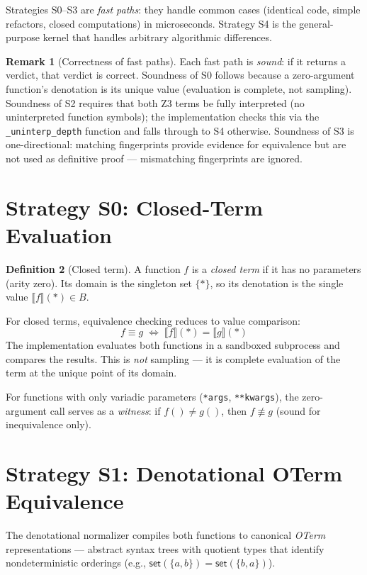 \documentclass[11pt,a4paper]{report}
\theoremstyle{definition}
\newtheorem{definition}{Definition}[chapter]
\newtheorem{remark}[definition]{Remark}
\theoremstyle{plain}
\newcommand{\den}[1]{\llbracket #1 \rrbracket}
\begin{document}
Strategies S0--S3 are \emph{fast paths}: they handle common cases
(identical code, simple refactors, closed computations) in
microseconds.  Strategy S4 is the general-purpose kernel that
handles arbitrary algorithmic differences.

\begin{remark}[Correctness of fast paths]
Each fast path is \emph{sound}: if it returns a verdict, that
verdict is correct.  Soundness of S0 follows because a zero-argument
function's denotation is its unique value (evaluation is
complete, not sampling).  Soundness of S2 requires that both
Z3 terms be fully interpreted (no uninterpreted function symbols);
the implementation checks this via the \texttt{\_uninterp\_depth}
function and falls through to S4 otherwise.  Soundness of S3 is
one-directional: matching fingerprints provide evidence for
equivalence but are not used as definitive proof --- mismatching
fingerprints are ignored.
\end{remark}

\section{Strategy S0: Closed-Term Evaluation}

\begin{definition}[Closed term]
A function $f$ is a \emph{closed term} if it has no parameters
(arity zero).  Its domain is the singleton set $\{*\}$, so its
denotation is the single value $\den{f}(*) \in B$.
\end{definition}

For closed terms, equivalence checking reduces to value comparison:
\[
  f \equiv g \;\iff\; \den{f}(*) = \den{g}(*)
\]
The implementation evaluates both functions in a sandboxed subprocess
and compares the results.  This is \emph{not} sampling --- it is
complete evaluation of the term at the unique point of its domain.

For functions with only variadic parameters (\texttt{*args},
\texttt{**kwargs}), the zero-argument call serves as a
\emph{witness}: if $f() \neq g()$, then $f \not\equiv g$
(sound for inequivalence only).

\section{Strategy S1: Denotational OTerm Equivalence}

The denotational normalizer compiles both functions to canonical
\emph{OTerm} representations --- abstract syntax trees with
quotient types that identify nondeterministic orderings (e.g.,
$\mathsf{set}(\{a, b\}) = \mathsf{set}(\{b, a\})$).
\end{document}
